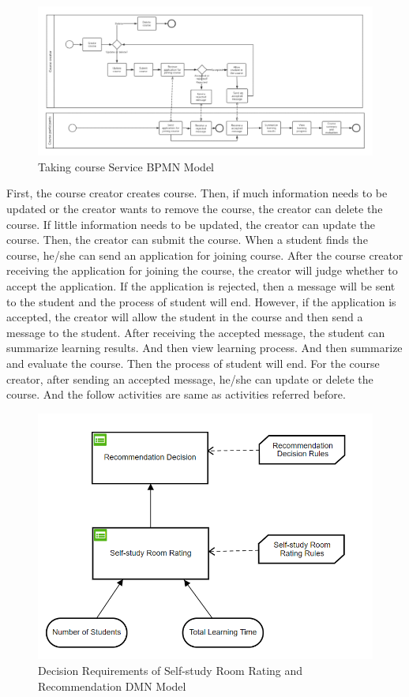 \documentclass[runningheads]{llncs}
\begin{document}
\begin{figure}[H]
		\centering %
		\includegraphics[width=1.0\textwidth]{./figure/LLT/BPMN} %
		\caption{Taking course Service BPMN Model} %
		\label{bpmn} %
	\end{figure}
First, the course creator creates course. Then, if much information needs to be updated or the creator wants to remove the course, the creator can delete the course. If little information needs to be updated, the creator can update the course. Then, the creator can submit the course. When a student finds the course, he/she can send an application for joining course. After the course creator receiving the application for joining the course, the creator will judge whether to accept the application. If the application is rejected, then a message will be sent to the student and the process of student will end. However, if the application is accepted, the creator will allow the student in the course and then send a message to the student. After receiving the accepted message, the student can summarize learning results. And then view learning process. And then summarize and evaluate the course. Then the process of student will end. For the course creator, after sending an accepted message, he/she can update or delete the course. And the follow activities are same as activities referred before.
\begin{figure}[H]
		\centering %
		\includegraphics[width=1.0\textwidth]{./figure/LLT/Decision} %
		\caption{Decision Requirements of Self-study Room Rating and Recommendation DMN Model} %
		\label{3} %
	\end{figure}
\end{document}
